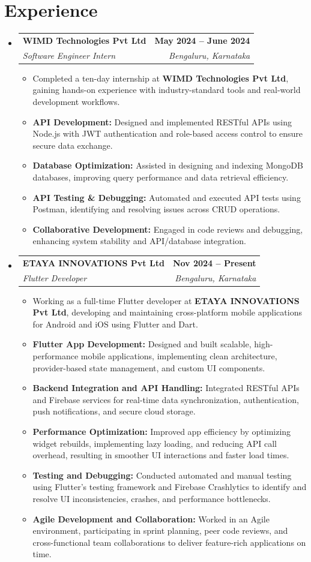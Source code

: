 \documentclass[a4paper,11pt]{article}
\makeatletter
\newcommand{\resumeItem}[1]{
	\item\small{#1 \vspace{-2pt}}
}
\newcommand{\resumeSubheading}[4]{
	\vspace{-2pt}\item
		\begin{tabular*}{0.97\textwidth}[t]{l@{\extracolsep{\fill}}r}
			\textbf{#1} & \textbf{\small #2} \\
			\textit{\small#3} & \textit{\small #4} \\
		\end{tabular*}\vspace{-7pt}
}
\newcommand{\resumeSubHeadingListStart}{\begin{itemize}[leftmargin=0.15in, label={}]}
\newcommand{\resumeSubHeadingListEnd}{\end{itemize}}
\newcommand{\resumeItemListStart}{\begin{itemize}}
\newcommand{\resumeItemListEnd}{\end{itemize}\vspace{-5pt}}
\makeatother
\begin{document}
\section{Experience}
\resumeSubHeadingListStart
\resumeSubheading
{WIMD Technologies Pvt Ltd}{May 2024 -- June 2024}
{Software Engineer Intern}{Bengaluru, Karnataka}
\resumeItemListStart
\resumeItem{Completed a ten-day internship at \textbf{WIMD Technologies Pvt Ltd}, gaining hands-on experience with industry-standard tools and real-world development workflows.}
\resumeItem{\textbf{API Development:} Designed and implemented RESTful APIs using Node.js with JWT authentication and role-based access control to ensure secure data exchange.}
\resumeItem{\textbf{Database Optimization:} Assisted in designing and indexing MongoDB databases, improving query performance and data retrieval efficiency.}
\resumeItem{\textbf{API Testing \& Debugging:} Automated and executed API tests using Postman, identifying and resolving issues across CRUD operations.}
\resumeItem{\textbf{Collaborative Development:} Engaged in code reviews and debugging, enhancing system stability and API/database integration.}
\resumeItemListEnd
\resumeSubheading
{ETAYA INNOVATIONS Pvt Ltd}{Nov 2024 -- Present}
{Flutter Developer}{Bengaluru, Karnataka}
\resumeItemListStart
\resumeItem{Working as a full-time Flutter developer at \textbf{ETAYA INNOVATIONS Pvt Ltd}, developing and maintaining cross-platform mobile applications for Android and iOS using Flutter and Dart.}
\resumeItem{\textbf{Flutter App Development:} Designed and built scalable, high-performance mobile applications, implementing clean architecture, provider-based state management, and custom UI components.}
\resumeItem{\textbf{Backend Integration and API Handling:} Integrated RESTful APIs and Firebase services for real-time data synchronization, authentication, push notifications, and secure cloud storage.}
\resumeItem{\textbf{Performance Optimization:} Improved app efficiency by optimizing widget rebuilds, implementing lazy loading, and reducing API call overhead, resulting in smoother UI interactions and faster load times.}
\resumeItem{\textbf{Testing and Debugging:} Conducted automated and manual testing using Flutter’s testing framework and Firebase Crashlytics to identify and resolve UI inconsistencies, crashes, and performance bottlenecks.}
\resumeItem{\textbf{Agile Development and Collaboration:} Worked in an Agile environment, participating in sprint planning, peer code reviews, and cross-functional team collaborations to deliver feature-rich applications on time.}
\resumeItemListEnd
\resumeSubHeadingListEnd
\end{document}
